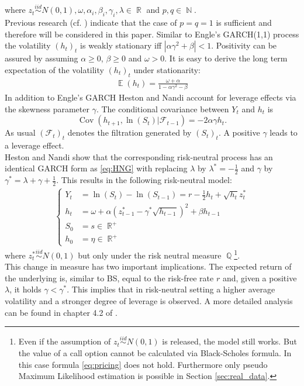 \documentclass{article}
\DeclareMathOperator{\E}{\mathbb{E}}
\DeclareMathOperator{\R}{\mathbb{R}}
\DeclareMathOperator{\N}{\mathbb{N}}
\DeclareMathOperator{\Q}{\mathbb{Q}}
\DeclareMathOperator{\Cov}{Cov}
\begin{document}
where $z_t\overset{iid}{\sim} N(0,1),\omega,\alpha_i,\beta_i,\gamma_i,\lambda\in\R$ and $p,q\in\N$.\\ Previous research (cf. \cite{GARCH}) indicate that the case of $p=q=1$ is sufficient and therefore will be considered in this paper. Similar to Engle's GARCH(1,1) process the volatility $(h_t)_t$ is weakly stationary iff  $|\alpha\gamma^2+\beta|<1$. Positivity can be assured by assuming $\alpha\geq 0$, $\beta\geq 0$ and $\omega >0$. It is easy to derive the long term expectation of the volatility $(h_t)_t$ under stationarity:
\begin{align*}
    \E(h_t)= \frac{\omega+\alpha}{1-\alpha \gamma^2-\beta}
\end{align*}
In addition to Engle's GARCH Heston and Nandi account for leverage effects via the skewness parameter $\gamma$. The conditional covariance between $Y_t$ and $h_t$ is 
\[\Cov(h_{t+1},\ln(S_t)|\mathcal{F}_{t-1})=-2\alpha\gamma h_t.\]
As usual $(\mathcal{F}_t)_t$ denotes the filtration generated by $(S_t)_t$. A positive $\gamma$ leads to a leverage effect. \\
Heston and Nandi show that the corresponding risk-neutral process has an identical GARCH form as \eqref{eq:HNG} with replacing $\lambda$ by $\lambda^*=-\frac{1}{2}$ and $\gamma$ by $\gamma^*=\lambda+\gamma+\frac{1}{2}$. This results in the following risk-neutral model:
\begin{align*}
\begin{cases}
Y_t&=\ln(S_t)-\ln(S_{t-1}) =r-\frac{1}{2}h_t+\sqrt{h_t}z^*_t\\
    h_t &= \omega+\alpha \left( z^*_{t-1}-\gamma^* \sqrt{h_{t-1}}\right)^2+\beta h_{t-1}\\
S_0&=s\in \R^+\\
h_0&=\eta\in \R^+\
\end{cases}
\end{align*}
where $z^*_t\overset{iid}{\sim} N(0,1)$ but only under the risk neutral measure $\Q$\footnote{Even if the assumption of $z_t\overset{iid}{\sim} N(0,1)$ is released, the model still works. But the value of a call option cannot be calculated via Black-Scholes formula. In this case formula \eqref{eq:pricing} does not hold. Furthermore only pseudo Maximum Likelihood estimation is possible in Section \ref{sec:real_data}.}.\\
This change in measure has two important implications. The expected return of the underlying is, similar to BS, equal to the risk-free rate $r$ and, given a positive $\lambda$, it holds $\gamma<\gamma^*$. This implies that in risk-neutral setting a higher average volatility  and  a stronger degree of leverage is observed. A more detailed analysis can be found in chapter 4.2 of \cite{Book}. \\
\end{document}
